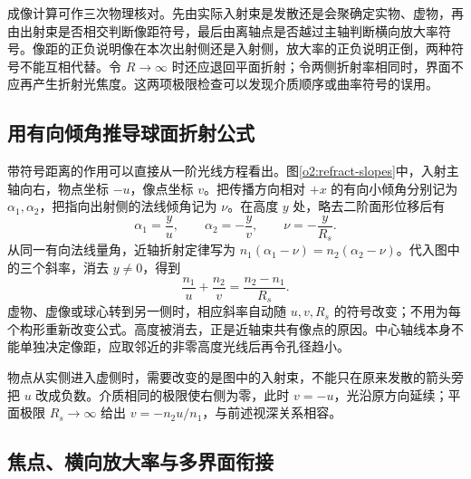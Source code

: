 成像计算可作三次物理核对。先由实际入射束是发散还是会聚确定实物、虚物，再由出射束是否相交判断像距符号，最后由离轴点是否越过主轴判断横向放大率符号。像距的正负说明像在本次出射侧还是入射侧，放大率的正负说明正倒，两种符号不能互相代替。令 $R\to\infty$ 时还应退回平面折射；令两侧折射率相同时，界面不应再产生折射光焦度。这两项极限检查可以发现介质顺序或曲率符号的误用。

\subsection{用有向倾角推导球面折射公式}

带符号距离的作用可以直接从一阶光线方程看出。图\ref{o2:refract-slopes}中，入射主轴向右，物点坐标 $-u$，像点坐标 $v$。把传播方向相对 $+x$ 的有向小倾角分别记为 $\alpha_1,\alpha_2$，把指向出射侧的法线倾角记为 $\nu$。在高度 $y$ 处，略去二阶面形位移后有
\[
\alpha_1=\frac yu,\qquad \alpha_2=-\frac yv,\qquad
\nu=-\frac y{R_s}.
\]
从同一有向法线量角，近轴折射定律写为 $n_1(\alpha_1-\nu)=n_2(\alpha_2-\nu)$。代入图中的三个斜率，消去 $y\ne0$，得到
\[
\frac{n_1}{u}+\frac{n_2}{v}=\frac{n_2-n_1}{R_s}.
\]
虚物、虚像或球心转到另一侧时，相应斜率自动随 $u,v,R_s$ 的符号改变；不用为每个构形重新改变公式。高度被消去，正是近轴束共有像点的原因。中心轴线本身不能单独决定像距，应取邻近的非零高度光线后再令孔径趋小。

物点从实侧进入虚侧时，需要改变的是图中的入射束，不能只在原来发散的箭头旁把 $u$ 改成负数。介质相同的极限使右侧为零，此时 $v=-u$，光沿原方向延续；平面极限 $R_s\to\infty$ 给出 $v=-n_2u/n_1$，与前述视深关系相容。


\subsection{焦点、横向放大率与多界面衔接}

